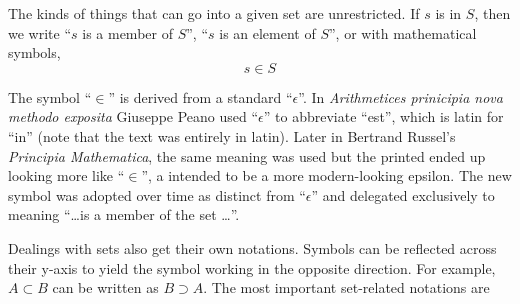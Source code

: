 \documentclass{article}
\begin{document}
	The kinds of things that can go into a given set are unrestricted. If $s$ is in $S$, then we write ``$s$ is a member of $S$'', ``$s$ is an element of $S$'', or with mathematical symbols,  \[ s \in S \]

	The symbol ``$\in$'' is derived from a standard ``$\epsilon$''. In \textit{Arithmetices prinicipia nova methodo exposita} Giuseppe Peano used ``$\epsilon$'' to abbreviate ``est'', which is latin for ``in'' (note that the text was entirely in latin). Later in Bertrand Russel's \textit{Principia Mathematica}, the same meaning was used but the printed ended up looking more like ``$\in$'', a intended to be a more modern-looking epsilon. The new symbol was adopted over time as distinct from ``$\epsilon$'' and delegated exclusively to meaning ``\dots is a member of the set \dots''.

	Dealings with sets also get their own notations. Symbols can be reflected across their y-axis to yield the symbol working in the opposite direction. For example, $A \subset B$ can be written as $B \supset A$. The most important set-related notations are
	
\end{document}

